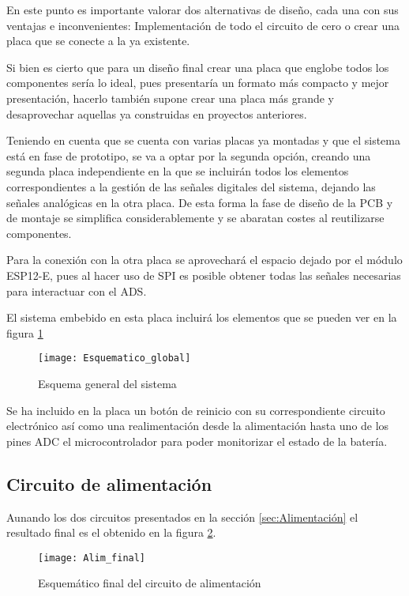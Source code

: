 En este punto es importante valorar dos alternativas de diseño, cada una con sus ventajas e inconvenientes: Implementación de todo el circuito de cero o crear una placa que se conecte a la ya existente.

Si bien es cierto que para un diseño final crear una placa que englobe todos los componentes sería lo ideal, pues presentaría un formato más compacto y mejor presentación, hacerlo también supone crear una placa más grande y desaprovechar aquellas ya construidas en proyectos anteriores.

Teniendo en cuenta que se cuenta con varias placas ya montadas y que el sistema está en fase de prototipo, se va a optar por la segunda opción, creando una segunda placa independiente en la que se incluirán todos los elementos correspondientes a la gestión de las señales digitales del sistema, dejando las señales analógicas en la otra placa. De esta forma la fase de diseño de la \acrshort{PCB} y de montaje se simplifica considerablemente y se abaratan costes al reutilizarse componentes.

Para la conexión con la otra placa se aprovechará el espacio dejado por el módulo ESP12-E, pues al hacer uso de \acrshort{SPI} es posible obtener todas las señales necesarias para interactuar con el ADS.

El sistema embebido en esta placa incluirá los elementos que se pueden ver en la figura \ref{fig:Esquematico_global}

\begin{figure} [h]
    \centering
    \texttt{[image: Esquematico\_global]}
    \caption{Esquema general del sistema}
    \label{fig:Esquematico_global}
\end{figure}

Se ha incluido en la placa un botón de reinicio con su correspondiente circuito electrónico así como una realimentación desde la alimentación hasta uno de los pines \acrshort{ADC} el microcontrolador para poder monitorizar el estado de la batería.

\subsection{Circuito de alimentación\label{sec:Esquemáticos_alim}}

Aunando los dos circuitos presentados en la sección \ref{sec:Alimentación} el resultado final es el obtenido en la figura \ref{fig:Alim_final}.

\begin{figure} [h]
    \centering
    \texttt{[image: Alim\_final]}
    \caption{Esquemático final del circuito de alimentación}
    \label{fig:Alim_final}
\end{figure}

